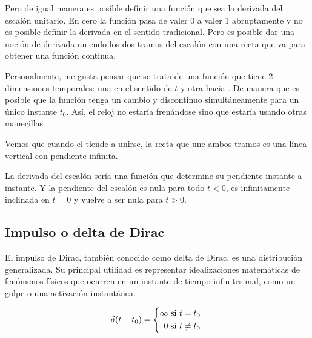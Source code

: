 Pero de igual manera es posible definir una función que sea la derivada del escalón unitario.
En cero la función pasa de valer 0 a valer 1 abruptamente y no es posible definir la derivada en el sentido tradicional.
Pero es posible dar una noción de derivada uniendo los dos tramos del escalón con una recta que va  para obtener una función continua.

\begin{center}
    \def\svgwidth{0.6\linewidth}
    
\end{center}

Personalmente, me gusta pensar que se trata de una función que tiene 2 dimensiones temporales: una en el sentido de $t$ y otra hacia .
De manera que es posible que la función tenga un cambio  y discontinuo simultáneamente para un único instante $t_0$.
Así, el reloj no estaría frenándose sino que estaría usando otras manecillas.

Vemos que cuando el  tiende a unirse, la recta que une ambos tramos es una línea vertical con pendiente infinita.

La derivada del escalón sería una función que determine su pendiente instante a instante.
Y la pendiente del escalón es nula para todo $t < 0$, es infinitamente inclinada en $t = 0$ y vuelve a ser nula para $t > 0$.

\subsection{Impulso o delta de Dirac}

El impulso de Dirac, también conocido como delta de Dirac, es una distribución generalizada.
Su principal utilidad es representar idealizaciones matemáticas de fenómenos físicos que ocurren en un instante de tiempo infinitesimal, como un golpe o una activación instantánea.

\begin{mdframed}[style=DefinitionFrame]
    \begin{defn}
    \end{defn}
    \[
        \fx[\delta]{t-t_0} =
        \left\{
        \begin{aligned}
            \infty \text{ si $t=t_0$ }
            \\
            0 \text{ si $t \neq t_0$ }
        \end{aligned}
        \right.
    \]
\end{mdframed}

